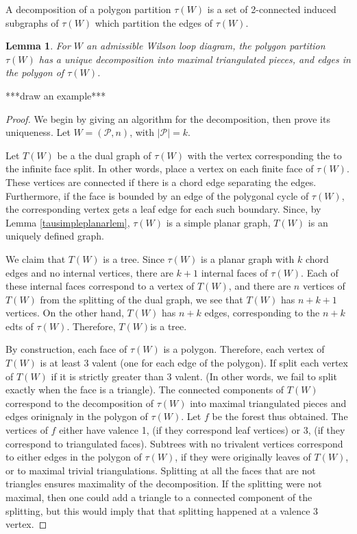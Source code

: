 \documentclass[11pt]{article}
\newcommand{\cP}{\mathcal{P}}
\newtheorem{lem}[thm]{Lemma}
\theoremstyle{remark}
\theoremstyle{definition}
\begin{document}
A decomposition of a polygon partition $\tau(W)$ is a set of 2-connected induced subgraphs of $\tau(W)$ which partition the edges of $\tau(W)$.

\begin{lem} \label{decompositionlem}
  For $W$ an admissible Wilson loop diagram, the polygon partition $\tau(W)$ has a unique decomposition into maximal triangulated pieces, and edges in the polygon of $\tau(W)$.
\end{lem}

***draw an example***

\begin{proof}
We begin by giving an algorithm for the decomposition, then prove its uniqueness. Let $W = (\cP, n)$, with $|\cP| = k$.

Let $T(W)$ be a the dual graph of $\tau(W)$ with the vertex corresponding the to the infinite face split. In other words, place a vertex on each finite face of $\tau(W)$. These vertices are connected if there is a chord edge separating the edges. Furthermore, if the face is bounded by an edge of the polygonal cycle of $\tau(W)$, the corresponding vertex gets a leaf edge for each such boundary. Since, by Lemma \ref{tausimpleplanarlem}, $\tau(W)$ is a simple planar graph, $T(W)$ is an uniquely defined graph.

We claim that $T(W)$ is a tree. Since $\tau(W)$ is a planar graph with $k$ chord edges and no internal vertices, there are $k+1$ internal faces of $\tau(W)$. Each of these internal faces correspond to a vertex of $T(W)$, and there are $n$ vertices of $T(W)$ from the splitting of the dual graph, we see that $T(W)$ has $n+k+1$ vertices. On the other hand, $T(W)$ has $n+k$ edges, corresponding to the $n +k$edts of $\tau(W)$. Therefore, $T(W)$is a tree.

By construction, each face of $\tau(W)$ is a polygon. Therefore, each vertex of $T(W)$ is at least 3 valent (one for each edge of the polygon). If split each vertex of $T(W)$ if it is strictly greater than $3$ valent. (In other words, we fail to split exactly when the face is a triangle). The connected components of $T(W)$ correspond to the decomposition of $\tau(W)$ into maximal triangulated pieces and edges orinignaly in the polygon of $\tau(W)$.  Let $f$ be the forest thus obtained. The vertices of $f$ either have valence 1, (if they correspond leaf vertices) or 3,  (if they correspond to triangulated faces). Subtrees with no trivalent vertices correspond to either edges in the polygon of $\tau(W)$, if they were originally leaves of $T(W)$, or to maximal trivial triangulations. Splitting at all the faces that are not triangles ensures maximality of the decomposition. If the splitting were not maximal, then one could add a triangle to a connected component of the splitting, but this would imply that that splitting happened at a valence $3$ vertex.


\end{proof}
\end{document}
